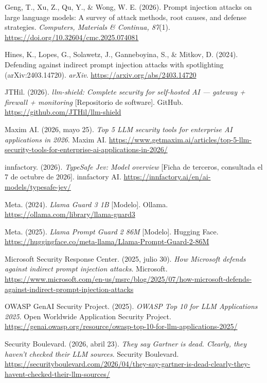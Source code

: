 \documentclass[11pt,letterpaper]{article}
\newcommand{\refapa}[1]{%
  \par\noindent\hangindent=1.25cm\hangafter=1 #1\par\vspace{0.5em}%
}
\begin{document}
{\hypertarget{geng2026}{}\refapa{Geng, T., Xu, Z., Qu, Y., \& Wong, W. E. (2026). Prompt injection attacks on large language models: A survey of attack methods, root causes, and defense strategies. \emph{Computers, Materials \& Continua, 87}(1). \url{https://doi.org/10.32604/cmc.2025.074081}}

\hypertarget{hines2024}{}\refapa{Hines, K., Lopes, G., Solawetz, J., Ganneboyina, S., \& Mitkov, D. (2024). Defending against indirect prompt injection attacks with spotlighting (arXiv:2403.14720). \emph{arXiv}. \url{https://arxiv.org/abs/2403.14720}}

\hypertarget{githubllmshield2026}{}\refapa{JTHil. (2026). \emph{llm-shield: Complete security for self-hosted AI --- gateway + firewall + monitoring} [Repositorio de software]. GitHub. \url{https://github.com/JTHil/llm-shield}}

\hypertarget{getmaxim2026}{}\refapa{Maxim AI. (2026, mayo 25). \emph{Top 5 LLM security tools for enterprise AI applications in 2026}. Maxim AI. \url{https://www.getmaxim.ai/articles/top-5-llm-security-tools-for-enterprise-ai-applications-in-2026/}}

\hypertarget{innfactory2026}{}\refapa{innfactory. (2026). \emph{TypeSafe Jev: Model overview} [Ficha de terceros, consultada el 7 de octubre de 2026]. innfactory AI. \url{https://innfactory.ai/en/ai-models/typesafe-jev/}}

\hypertarget{metalg2024}{}\refapa{Meta. (2024). \emph{Llama Guard 3 1B} [Modelo]. Ollama. \url{https://ollama.com/library/llama-guard3}}

\hypertarget{metapg2025}{}\refapa{Meta. (2025). \emph{Llama Prompt Guard 2 86M} [Modelo]. Hugging Face. \url{https://huggingface.co/meta-llama/Llama-Prompt-Guard-2-86M}}

\hypertarget{microsoft2025}{}\refapa{Microsoft Security Response Center. (2025, julio 30). \emph{How Microsoft defends against indirect prompt injection attacks}. Microsoft. \url{https://www.microsoft.com/en-us/msrc/blog/2025/07/how-microsoft-defends-against-indirect-prompt-injection-attacks}}

\hypertarget{owasp2025}{}\refapa{OWASP GenAI Security Project. (2025). \emph{OWASP Top 10 for LLM Applications 2025}. Open Worldwide Application Security Project. \url{https://genai.owasp.org/resource/owasp-top-10-for-llm-applications-2025/}}

\hypertarget{securityboulevard2026}{}\refapa{Security Boulevard. (2026, abril 23). \emph{They say Gartner is dead. Clearly, they haven't checked their LLM sources}. Security Boulevard. \url{https://securityboulevard.com/2026/04/they-say-gartner-is-dead-clearly-they-havent-checked-their-llm-sources/}}

}
\end{document}
